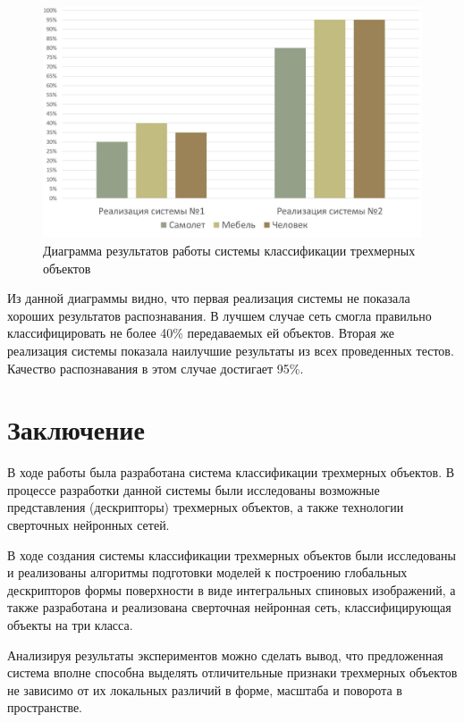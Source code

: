 \documentclass[14pt]{article}
\numberwithin{figure}{section}
\numberwithin{equation}{section}
\begin{document}
\begin{figure}[h]
   \begin{center}
       \includegraphics[scale=0.3] {13.JPG}
       \caption{Диаграмма результатов работы системы классификации трехмерных объектов}
       \label{ris:13}
   \end{center}
\end{figure}

Из данной диаграммы видно, что первая реализация системы не показала хороших результатов распознавания. В лучшем случае сеть смогла правильно классифицировать не более 40\% передаваемых ей объектов. Вторая же реализация системы показала наилучшие результаты из всех проведенных тестов. Качество распознавания в этом случае достигает 95\%.

\newpage
{}
\section*{Заключение}

В ходе работы была разработана система классификации трехмерных объектов. В процессе разработки данной системы были исследованы возможные представления (дескрипторы) трехмерных объектов, а также технологии сверточных нейронных сетей.

В ходе создания системы классификации трехмерных объектов были исследованы и реализованы алгоритмы подготовки моделей к построению глобальных дескрипторов формы поверхности в виде интегральных спиновых изображений, а также разработана и реализована сверточная нейронная сеть, классифицирующая объекты на три класса.

Анализируя результаты экспериментов можно сделать вывод, что предложенная система вполне способна выделять отличительные признаки трехмерных объектов не зависимо от их локальных различий в форме, масштаба и поворота в пространстве.
\end{document}
